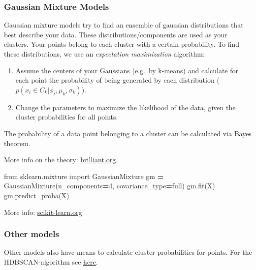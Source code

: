 \documentclass[
]{book}
\newenvironment{Shaded}{\begin{snugshade}}{\end{snugshade}}
\newcommand{\DecValTok}[1]{\textcolor[rgb]{0.00,0.00,0.81}{#1}}
\newcommand{\ImportTok}[1]{#1}
\newcommand{\NormalTok}[1]{#1}
\newcommand{\OperatorTok}[1]{\textcolor[rgb]{0.81,0.36,0.00}{\textbf{#1}}}
\newcommand{\StringTok}[1]{\textcolor[rgb]{0.31,0.60,0.02}{#1}}
\begin{document}
\hypertarget{gaussian-mixture-models}{%
\subsubsection{Gaussian Mixture Models}\label{gaussian-mixture-models}}

Gaussian mixture models try to find an ensemble of gaussian
distributions that best describe your data. These
distributions/components are used as your clusters. Your points belong
to each cluster with a certain probability. To find these distributions,
we use an \emph{expectation maximization} algorithm:

\begin{enumerate}
\def\labelenumi{\arabic{enumi}.}
\item
  Assume the centers of your Gaussians (e.g.~by k-means) and calculate
  for each point the probability of being generated by each
  distribution (\(p(x_i \in C_k | \phi_i, \mu_k, \sigma_k)\)).
\item
  Change the parameters to maximize the likelihood of the data, given
  the cluster probabilities for all points.
\end{enumerate}

The probability of a data point belonging to a cluster can be calculated
via Bayes theorem.

More info on the theory:
\href{https://brilliant.org/wiki/gaussian-mixture-model/}{brilliant.org}.

\begin{Shaded}
\begin{Highlighting}[]
\ImportTok{from}\NormalTok{ sklearn.mixture }\ImportTok{import}\NormalTok{ GaussianMixture}
\NormalTok{gm }\OperatorTok{=}\NormalTok{ GaussianMixture(n\_components}\OperatorTok{=}\DecValTok{4}\NormalTok{, covariance\_type}\OperatorTok{=}\StringTok{\textquotesingle{}full\textquotesingle{}}\NormalTok{)}
\NormalTok{gm.fit(X)}
\NormalTok{gm.predict\_proba(X)}
\end{Highlighting}
\end{Shaded}

More info:
\href{https://scikit-learn.org/stable/modules/generated/sklearn.mixture.GaussianMixture.html}{scikit-learn.org}

\hypertarget{other-models}{%
\subsubsection{Other models}\label{other-models}}

Other models also have means to calculate cluster probabilities for points.
For the HDBSCAN-algorithm see \href{https://hdbscan.readthedocs.io/en/latest/soft_clustering.html}{here}.
\end{document}

